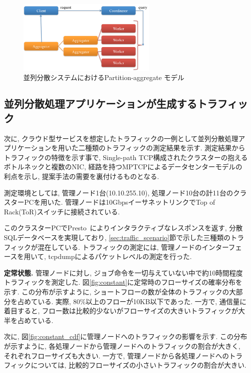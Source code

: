 \documentclass[11pt, a4paper, twocolumn]{jsarticle}
\begin{document}
\begin{figure}[h]
    \begin{center}
    \includegraphics[autoebb, width=195pt]{./img/part_aggr.pdf}
    \caption{並列分散システムにおけるPartition-aggregate モデル}
    \label{fig:part_aggr}
    \end{center}
\end{figure}

\subsection{並列分散処理アプリケーションが生成するトラフィック}
\label{sec:traffic_character}
次に, クラウド型サービスを想定したトラフィックの一例として並列分散処理アプリケーションを用いた二種類のトラフィックの測定結果を示す.
測定結果からトラフィックの特徴を示す事で, Single-path TCP構成されたクラスターの抱えるボトルネックと複数のNIC,
経路を持つMPTCPによるデータセンターモデルの利点を示し, 提案手法の需要を裏付けるものとなる.

測定環境としては, 管理ノード1台(10.10.255.10), 処理ノード10台の計11台のクラスターPCを用いた.
管理ノードは10GbpsイーサネットリンクでTop of Rack(ToR)スイッチに接続されている.

このクラスターPCでPresto~\cite{presto}によりインタラクティブなレスポンスを返す, 分散SQLデータベースを実現しており,
\ref{sec:traffic_scenario}節で示した三種類のトラフィックが混在している.
トラフィックの測定には, 管理ノードのインターフェースを用いて, tcpdumpによるパケットレベルの測定を行った.

{\bf 定常状態. }
管理ノードに対し, ジョブ命令を一切与えていない中で約10時間程度トラフィックを測定した.
図\ref{fig:constant}に定常時のフローサイズの確率分布を示す.
この分布が示すように, ショートフローの数が全体のトラフィックの大部分を占めている.
実際, 80\%以上のフローが10KB以下であった.
一方で, 通信量に着目すると, フロー数は比較的少ないがフローサイズの大きいトラフィックが大半を占めている.

次に, 図\ref{fig:constant_cdf}に管理ノードへのトラフィックの影響を示す.
この分布が示すように, 各処理ノードから管理ノードへのトラフィックの割合が大きく, それぞれフローサイズも大きい.
一方で, 管理ノードから各処理ノードへのトラフィックについては, 比較的フローサイズの小さいトラフィックの割合が大きい.
\end{document}
